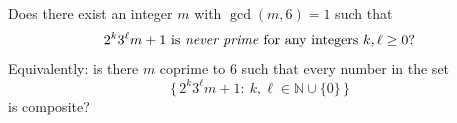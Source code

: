 Does there exist an integer $m$ with $\gcd(m,6)=1$ such that
\[
2^k 3^\ell m + 1\ \text{is \emph{never prime} for any integers }k,\ell\ge 0?
\]
Equivalently: is there $m$ coprime to $6$ such that every number in the set
\[
\{\,2^k 3^\ell m + 1:\ k,\ell\in\mathbb{N}\cup\{0\}\,\}
\]
is composite?
